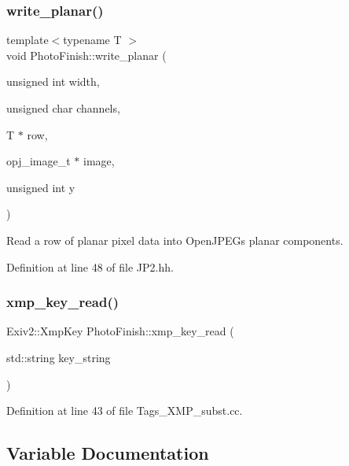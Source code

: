 \mbox{\label{namespace_photo_finish_a8ac95b8e0f1442d867620a2af03b193a}} 
\subsubsection{\texorpdfstring{write\+\_\+planar()}{write\_planar()}}
{\footnotesize\ttfamily template$<$typename T $>$ \\
void Photo\+Finish\+::write\+\_\+planar (\begin{DoxyParamCaption}\item[{unsigned int}]{width,  }\item[{unsigned char}]{channels,  }\item[{T $\ast$}]{row,  }\item[{opj\+\_\+image\+\_\+t $\ast$}]{image,  }\item[{unsigned int}]{y }\end{DoxyParamCaption})}



Read a row of planar pixel data into Open\+J\+P\+EG\textquotesingle{}s planar components. 



Definition at line 48 of file J\+P2.\+hh.

\mbox{\label{namespace_photo_finish_a54ed3d9f6f4c8014b374ef85f29182d0}} 
\subsubsection{\texorpdfstring{xmp\+\_\+key\+\_\+read()}{xmp\_key\_read()}}
{\footnotesize\ttfamily Exiv2\+::\+Xmp\+Key Photo\+Finish\+::xmp\+\_\+key\+\_\+read (\begin{DoxyParamCaption}\item[{std\+::string}]{key\+\_\+string }\end{DoxyParamCaption})}



Definition at line 43 of file Tags\+\_\+\+X\+M\+P\+\_\+subst.\+cc.



\subsection{Variable Documentation}
\mbox{\label{namespace_photo_finish_a9fdd5a183ce1374d876e4f23f1b0fbf3}} 
